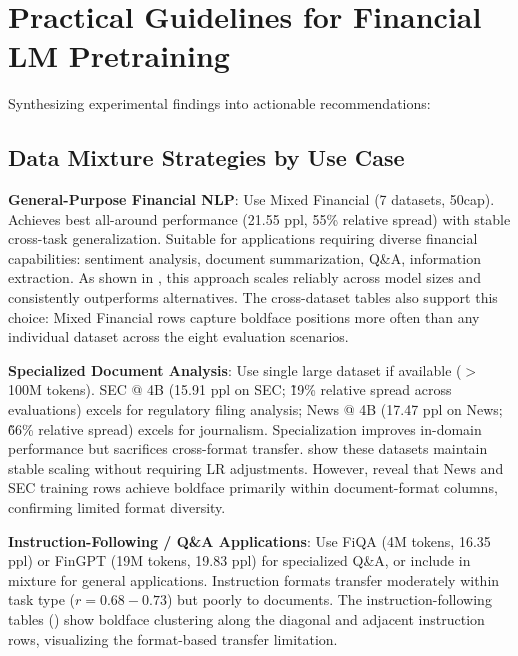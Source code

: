 \section{Practical Guidelines for Financial LM Pretraining}

Synthesizing experimental findings into actionable recommendations:

\subsection{Data Mixture Strategies by Use Case}

\textbf{General-Purpose Financial NLP}: Use Mixed Financial (7 datasets, 50cap). Achieves best all-around performance (21.55 ppl, 55\% relative spread) with stable cross-task generalization. Suitable for applications requiring diverse financial capabilities: sentiment analysis, document summarization, Q\&A, information extraction. As shown in , this approach scales reliably across model sizes and consistently outperforms alternatives. The cross-dataset tables also support this choice: Mixed Financial rows capture boldface positions more often than any individual dataset across the eight evaluation scenarios.

\textbf{Specialized Document Analysis}: Use single large dataset if available ($>$ 100M tokens). SEC @ 4B (15.91 ppl on SEC; \~19\% relative spread across evaluations) excels for regulatory filing analysis; News @ 4B (17.47 ppl on News; \~66\% relative spread) excels for journalism. Specialization improves in-domain performance but sacrifices cross-format transfer.  show these datasets maintain stable scaling without requiring LR adjustments. However,  reveal that News and SEC training rows achieve boldface primarily within document-format columns, confirming limited format diversity.

\textbf{Instruction-Following / Q\&A Applications}: Use FiQA (4M tokens, 16.35 ppl) or FinGPT (19M tokens, 19.83 ppl) for specialized Q\&A, or include in mixture for general applications. Instruction formats transfer moderately within task type ($r = 0.68-0.73$) but poorly to documents. The instruction-following tables () show boldface clustering along the diagonal and adjacent instruction rows, visualizing the format-based transfer limitation.

